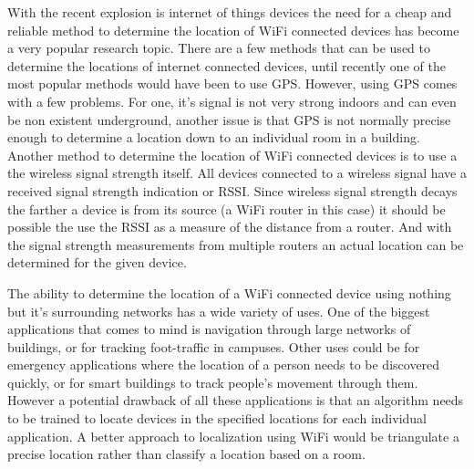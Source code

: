 \documentclass[12pt,letterpaper]{article}
\begin{document}


\frenchspacing\raggedright\setlength{\parindent}{.5in}
 


\par With the recent explosion is internet of things devices the need for a cheap and reliable method to determine the location of WiFi connected devices has become a very popular research topic. There are a few methods that can be used to determine the locations of internet connected devices, until recently one of the most popular methods would have been to use GPS. However, using GPS comes with a few problems. For one, it's signal is not very strong indoors and can even be non existent underground, another issue is that GPS is not normally precise enough to determine a location down to an individual room in a building. Another method to determine the location of WiFi connected devices is to use a the wireless signal strength itself. All devices connected to a wireless signal have a received signal strength indication or RSSI. Since wireless signal strength decays the farther a device is from its source (a WiFi router in this case) it should be possible the use the RSSI as a measure of the distance from a router. And with the signal strength measurements from multiple routers an actual location can be determined for the given device. 

\par The ability to determine the location of a WiFi connected device using nothing but it's surrounding networks has a wide variety of uses. One of the biggest applications that comes to mind is navigation through large networks of buildings, or for tracking foot-traffic in campuses. Other uses could be for emergency applications where the location of a person needs to be discovered quickly, or for smart buildings to track people's movement through them. However a potential drawback of all these applications is that an algorithm needs to be trained to locate devices in the specified locations for each individual application. A better approach to localization using WiFi would be triangulate a precise location rather than classify a location based on a room. 

\end{document}
